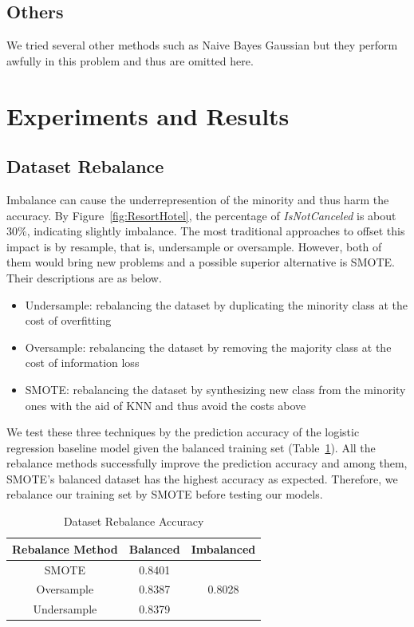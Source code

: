 \documentclass[10pt,twocolumn,letterpaper]{article}
\begin{document}
\subsection{Others}

We tried several other methods such as Naive Bayes Gaussian but they perform awfully in this problem and thus are omitted here.


\section{Experiments and Results}

\subsection{Dataset Rebalance}
Imbalance can cause the underrepresention of the minority and thus harm the accuracy. By Figure~\ref{fig:ResortHotel}, the percentage of \emph{IsNotCanceled} is about 30\%, indicating slightly imbalance. The most traditional approaches to offset this impact is by resample, that is, undersample or oversample. However, both of them would bring new problems and a possible superior alternative is SMOTE. Their descriptions are as below.

\begin{itemize}
    \item Undersample: rebalancing the dataset by duplicating the minority class at the cost of overfitting
    \item Oversample: rebalancing the dataset by removing the majority class at the cost of information loss
    \item SMOTE: rebalancing the dataset by synthesizing new class from the minority ones with the aid of KNN and thus avoid the costs above
\end{itemize}

We test these three techniques by the prediction accuracy of the logistic regression baseline model given the balanced training set (Table~\ref{tab:RebalanceAcc}). All the rebalance methods successfully improve the prediction accuracy and among them, SMOTE's balanced dataset has the highest accuracy as expected. Therefore, we rebalance our training set by SMOTE before testing our models.

\begin{table}[ht]
\begin{center}
\begin{tabular}{|c|c|c|} \hline
Rebalance Method &  Balanced &  Imbalanced \\ \hline
SMOTE       &  0.8401 &  \\
Oversample  &  0.8387 & 0.8028 \\
Undersample &  0.8379 &  \\ \hline
\end{tabular}
\end{center}
\caption{\label{tab:RebalanceAcc} Dataset Rebalance Accuracy}
\end{table}
\end{document}
